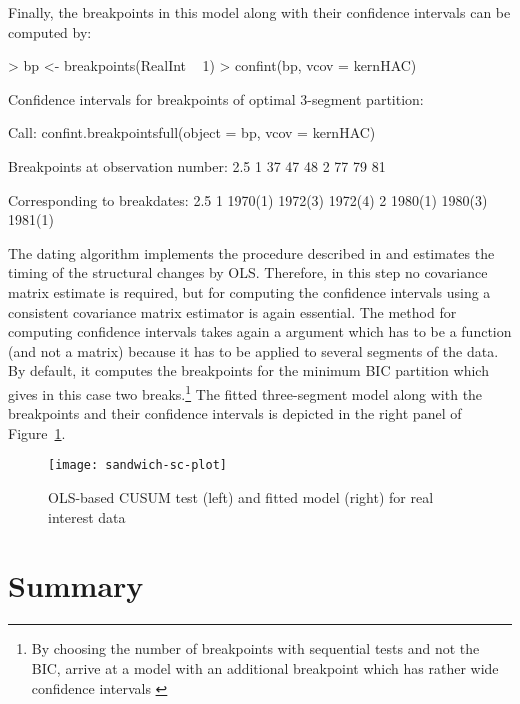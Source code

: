 \documentclass{Z}
\begin{document}
Finally, the breakpoints in this model along with their confidence intervals
can be computed by:
\begin{Schunk}
\begin{Sinput}
> bp <- breakpoints(RealInt ~ 1)
> confint(bp, vcov = kernHAC)
\end{Sinput}
\begin{Soutput}
	 Confidence intervals for breakpoints
	 of optimal 3-segment partition: 

Call:
confint.breakpointsfull(object = bp, vcov = kernHAC)

Breakpoints at observation number:
  2.5 % breakpoints 97.5 %
1    37          47     48
2    77          79     81

Corresponding to breakdates:
  2.5 %   breakpoints 97.5 % 
1 1970(1) 1972(3)     1972(4)
2 1980(1) 1980(3)     1981(1)
\end{Soutput}
\end{Schunk}
The dating algorithm  implements the procedure described in
\cite{hac:Bai+Perron:2003} and estimates the timing of the structural changes
by OLS. Therefore, in this step no covariance matrix estimate is required, but for
computing the confidence intervals using a consistent covariance matrix estimator
is again essential. The  method for computing confidence intervals
takes again a  argument which has to be a function (and not a matrix) because
it has to be applied to several segments of the data. By default, it computes the
breakpoints for the minimum BIC partition which gives in this case two
breaks.\footnote{By choosing the number of breakpoints with sequential tests 
and not the BIC, \cite{hac:Bai+Perron:2003} arrive at a model with an additional 
breakpoint which has rather wide confidence intervals \citep[see also][]{hac:Zeileis+Kleiber:2004}}
The fitted three-segment model along with the breakpoints and their confidence
intervals is depicted in the right panel of Figure~\ref{fig:sc}.

\begin{figure}[tbh]
\begin{center}
\texttt{[image: sandwich-sc-plot]}
\caption{\label{fig:sc} OLS-based CUSUM test (left) and fitted model (right) for real interest data}
\end{center}
\end{figure}


\section{Summary} \label{sec:summary}
\end{document}
